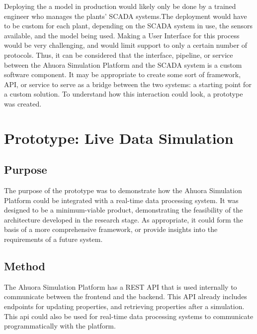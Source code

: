 \documentclass[12pt]{report}
\begin{document}
Deploying the a model in production would likely only be done by a trained engineer who manages the plants' SCADA systems.The deployment would have to be custom for each plant, depending on the SCADA system in use, the sensors available, and the model being used. Making a User Interface for this process would be very challenging, and would limit support to only a certain number of protocols. Thus, it can be considered that the interface, pipeline, or service between the Ahuora Simulation Platform and the SCADA system is a custom software component. It may be appropriate to create some sort of framework, API, or service to serve as a bridge between the two systems: a starting point for a custom solution. To understand how this interaction could look, a prototype was created. 


\chapter{Prototype: Live Data Simulation} \label{sec:simulationprototype}

\section{Purpose}

The purpose of the prototype was to demonstrate how the Ahuora Simulation Platform could be integrated with a real-time data processing system. It was designed to be a minimum-viable product, demonstrating the feasibility of the architecture developed in the research stage. As appropriate, it could form the basis of a more comprehensive framework, or provide insights into the requirements of a future system.

\section{Method}


The Ahuora Simulation Platform has a REST API that is used internally to communicate between the frontend and the backend. This API already includes endpoints for updating properties, and retrieving properties after a simulation. This api could also be used for real-time data processing systems to communicate programmatically with the platform.
\end{document}
